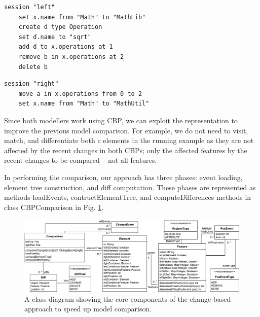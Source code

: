 \documentclass{jot}
\begin{document}
\begin{minipage}[t]{0.49\linewidth}    
    \begin{lstlisting}[firstnumber=13,style=eol,caption={The appended changes made by Bob to produce the model in Fig. \ref{fig:left}  (left version).},label=lst:leftcbp]
    session "left"
    set x.name from "Math" to "MathLib"
    create d type Operation
    set d.name to "sqrt"
    add d to x.operations at 1
    remove b in x.operations at 2
    delete b
    \end{lstlisting}
\end{minipage}
\hfill
\begin{minipage}[t]{0.49\linewidth}
    \begin{lstlisting}[firstnumber=13,style=eol,caption={The appended changes made by Alice to produce the model in Fig. \ref{fig:right} (right version).},label=lst:rightcbp]
    session "right"
    move a in x.operations from 0 to 2
    set x.name from "Math" to "MathUtil"
    \end{lstlisting}
\end{minipage}

Since both modellers work using CBP, we can exploit the representation to improve the previous model comparison. For example, we do not need to visit, match, and differentiate both \textsf{c} elements in the running example as they are not affected by the recent changes in both CBPs; only the affected features by the recent changes to be compared -- not all features. 

In performing the comparison, our approach has three phases: event loading, element tree construction, and diff computation. These phases are represented as methods \textsf{loadEvents}, \textsf{contructElementTree}, and \textsf{computeDifferences} methods in class \textsf{CBPComparison} in Fig. \ref{fig:approach_class_diagram}. 

\begin{figure}
    \includegraphics[width=\linewidth]{TreeClassDiagram}
    \caption{A class diagram showing the core components of the change-based approach to speed up model comparison.}
    \label{fig:approach_class_diagram}
\end{figure}
\end{document}
